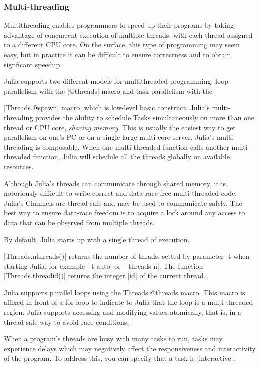 \subsubsection*{Multi-threading}

Multithreading enables programmers to speed up their programs by taking advantage of concurrent execution of multiple threads, with each thread assigned to a different CPU core. On the surface, this type of programming may seem easy, but in practice it can be difficult to ensure correctness and to obtain signficant speedup. 

Julia supports two different models for multithreaded programming: loop parallelism with the |@threads| macro and task parallelism with the 

  |Threads.@spawn| macro, which is low-level basic construct.
Julia's multi-threading provides the ability to schedule Tasks simultaneously on more than one thread or CPU core, \emph{sharing memory}. 
This is usually the easiest way to get parallelism on one's PC or on a single large multi-core server. Julia's multi-threading is composable. When one multi-threaded function calls another multi-threaded function, Julia will schedule all the threads globally on available resources.

Although Julia's threads can communicate through shared memory, it is notoriously difficult to write correct and data-race free multi-threaded code. Julia's Channels are thread-safe and may be used to communicate safely. The best way to ensure data-race freedom is to acquire a lock around any access to data that can be observed from multiple threads. 

By default, Julia starts up with a single thread of execution. 

  |Threads.nthreads()| returns the number of thrads, setted by parameter -t when starting Julia, for example |-t auto| or |--threads n|. The function |Threads.threadid()| returns the integer |id| of the current thread.


Julia supports parallel loops using the {Threads.@threads} macro. This macro is affixed in front of a for loop to indicate to Julia that the loop is a multi-threaded region.  Julia supports accessing and modifying values atomically, that is, in a thread-safe way to avoid race conditions.

When a program's threads are busy with many tasks to run, tasks may experience delays which may negatively affect the responsiveness and interactivity of the program. To address this, you can specify that a task is |interactive|.

